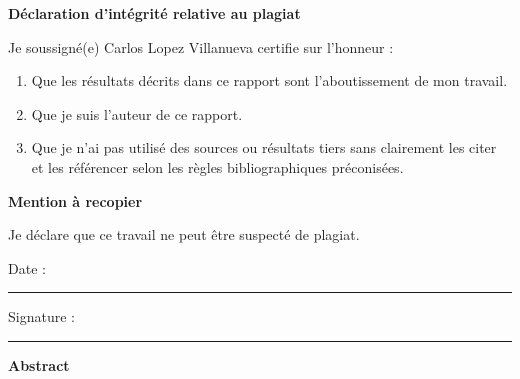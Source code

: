 \documentclass[%
 reprint,
nofootinbib,
 amsmath,amssymb,
 aps,
]{revtex4-2}
\begin{document}
\clearpage
\thispagestyle{empty}
\begin{center}
    {\large\bfseries D\'eclaration d'int\'egrit\'e relative au plagiat\par}
\end{center}

\vspace{1.5cm}

Je soussign\'e(e) Carlos Lopez Villanueva certifie sur l'honneur :

\begin{enumerate}
    \item Que les r\'esultats d\'ecrits dans ce rapport sont l'aboutissement de mon travail.
    \item Que je suis l'auteur de ce rapport.
    \item Que je n'ai pas utilis\'e des sources ou r\'esultats tiers sans clairement les citer et les r\'ef\'erencer selon les r\`egles bibliographiques pr\'econis\'ees.
\end{enumerate}

\vspace{1.2cm}

\noindent\textbf{Mention \`a recopier}\par

\vspace{0.4cm}

\noindent Je d\'eclare que ce travail ne peut \^etre suspect\'e de plagiat.

\vfill

\noindent Date : \rule{2.3cm}{0.4pt}\hfill Signature : \rule{2.3cm}{0.4pt}

\clearpage
\thispagestyle{plain}
\begin{center}
    {\Large\bfseries Abstract\par}
\end{center}

\vspace{1.2cm}
\end{document}
